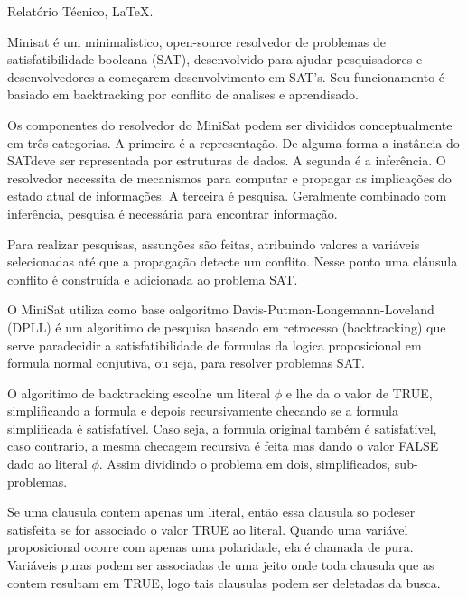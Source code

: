 \documentclass[a4paper, 12pt]{article}
\makeatletter
\newenvironment{palavras-chave}{%
  \list{}{%
    \leftmargin=0.8cm
    \labelwidth=\z@
    \listparindent=\z@
    \itemindent\listparindent
    \rightmargin\leftmargin}\item[\hskip\labelsep
  \bfseries Palavras-Chave:]}%
{\endlist}
\makeatother
\begin{document}
\begin{palavras-chave}
Relatório Técnico, \LaTeX.
\end{palavras-chave}





Minisat é um minimalistico, open-source resolvedor de problemas de satisfatibilidade booleana (SAT), desenvolvido para 
ajudar pesquisadores e desenvolvedores a começarem desenvolvimento em SAT's. Seu funcionamento é basiado em backtracking
por conflito de analises e aprendisado.

Os componentes do resolvedor do MiniSat podem ser divididos conceptualmente em três categorias. A primeira é a representação.
De alguma forma a instância do SATdeve ser representada por estruturas de dados. A segunda é a inferência. O resolvedor necessita
de mecanismos para computar e propagar as implicações do estado atual de informações. A terceira é pesquisa. Geralmente combinado
com inferência, pesquisa é necessária para encontrar informação.

Para realizar pesquisas, assunções são feitas, atribuindo valores a variáveis selecionadas até que a propagação detecte um conflito.
Nesse ponto uma cláusula conflito é construída e adicionada ao problema SAT.

O MiniSat utiliza como base oalgoritmo Davis-Putman-Longemann-Loveland (DPLL) é um algoritimo de pesquisa baseado em 
retrocesso (backtracking) que serve paradecidir a satisfatibilidade de formulas da logica proposicional em formula normal
conjutiva, ou seja, para resolver problemas SAT.

O algoritimo de backtracking escolhe um literal $\phi$ e lhe da o valor de TRUE, simplificando a formula e depois
recursivamente checando se a formula simplificada é satisfatível. Caso seja, a formula original também é
satisfatível, caso contrario, a mesma checagem recursiva é feita mas dando o valor FALSE dado ao literal $\phi$.
Assim dividindo o problema em dois, simplificados, sub-problemas.

Se uma clausula contem apenas um literal, então essa clausula so podeser satisfeita se for associado o valor
TRUE ao literal. Quando uma variável proposicional ocorre com apenas uma polaridade, ela é chamada de pura. Variáveis puras
podem ser associadas de uma jeito onde toda clausula que as contem resultam em TRUE, logo tais clausulas podem
ser deletadas da busca.
\end{document}
